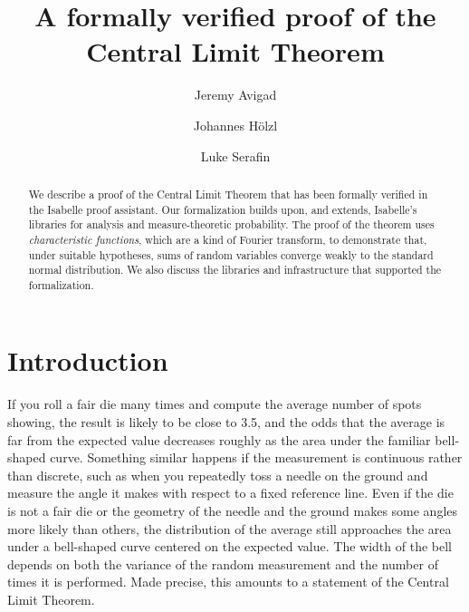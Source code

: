 \documentclass{svjour3}
\begin{document}
\title{A formally verified proof of the Central Limit Theorem}


\author{Jeremy Avigad \and Johannes H\"olzl \and Luke Serafin}


\maketitle

\begin{abstract}
We describe a proof of the Central Limit Theorem that has been formally verified in the Isabelle proof assistant. Our formalization builds upon, and extends, Isabelle's libraries for analysis and measure-theoretic probability. 
The proof of the theorem uses \emph{characteristic functions}, which are a kind of Fourier transform, to demonstrate that, under suitable hypotheses, sums of random variables converge weakly to the standard normal distribution. We also discuss the libraries and infrastructure that supported the formalization.
\end{abstract}


\section{Introduction}
\label{section:introduction}

If you roll a fair die many times and compute the average number of spots showing, the result is likely to be close to 3.5, and the odds that the average is far from the expected value decreases roughly as the area under the familiar bell-shaped curve. Something similar happens if the measurement is continuous rather than discrete, such as when you repeatedly toss a needle on the ground and measure the angle it makes with respect to a fixed reference line. Even if the die is not a fair die or the geometry of the needle and the ground makes some angles more likely than others, the distribution of the average still approaches the area under a bell-shaped curve centered on the expected value. The width of the bell depends on both the variance of the random measurement and the number of times it is performed. Made precise, this amounts to a statement of the Central Limit Theorem.
\end{document}

